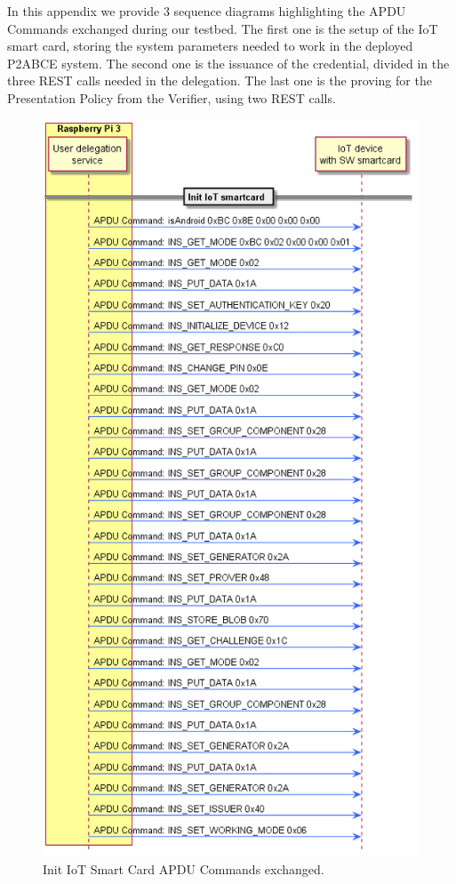 In this appendix we provide 3 sequence diagrams highlighting the APDU Commands exchanged during our testbed. The first one is the setup of the IoT smart card, storing the system parameters needed to work in the deployed P2ABCE system. The second one is the issuance of the credential, divided in the three REST calls needed in the delegation. The last one is the proving for the Presentation Policy from the Verifier, using two REST calls.


\begin{figure}[bth]
	\begin{center}
		\includegraphics[width=0.9\linewidth]{gfx/APDUsInitIoTSC}
	\end{center}
	\caption{Init IoT Smart Card APDU Commands exchanged.}
	\label{fig:APDUsInitIoTSC}
\end{figure}


